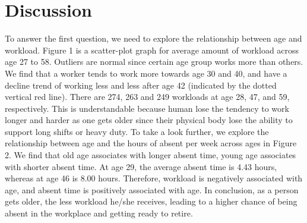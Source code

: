 \documentclass{article}
\begin{document}
\section{Discussion}
To answer the first question, we need to explore the relationship between age and workload. Figure 1 is a scatter-plot graph for average amount of workload across age 27 to 58. Outliers are normal since certain age group works more than others. We find that a worker tends to work more towards age 30 and 40, and have a decline trend of working less and less after age 42 (indicated by the dotted vertical red line). There are 274, 263 and 249 workloads at age 28, 47, and 59, respectively. This is understandable because human lose the tendency to work longer and harder as one gets older since their physical body lose the ability to support long shifts or heavy duty. To take a look further, we explore the relationship between age and the hours of absent per week across ages in Figure 2. We find that old age associates with longer absent time, young age associates with shorter absent time. At age 29, the average absent time is 4.43 hours, whereas at age 46 is 8.00 hours. Therefore, workload is negatively associated with age, and absent time is positively associated with age. In conclusion, as a person gets older, the less workload he/she receives, leading to a higher chance of being absent in the workplace and getting ready to retire.
\end{document}
